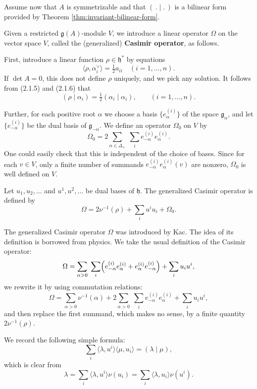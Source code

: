 \documentclass[12pt]{article}
\begin{document}
Assume now that $A$ is symmetrizable and that $(\,.\mid.\,)$ is a bilinear form provided by Theorem \ref{thm:invariant-bilinear-form}.

Given a restricted $\mathfrak{g}(A)$-module $V$, we introduce a linear operator $\Omega$ on the vector space $V$, called the (generalized) \textbf{Casimir operator}, as follows.  

First, introduce a linear function $\rho \in \mathfrak{h}^*$ by equations
\[
\langle \rho,\alpha_i^\vee \rangle = \tfrac{1}{2}a_{ii} \quad (i=1,\dots,n).
\]
If $\det A=0$, this does not define $\rho$ uniquely, and we pick any solution. 
It follows from (2.1.5) and (2.1.6) that
\[
(\rho\mid \alpha_i) = \tfrac{1}{2}(\alpha_i\mid \alpha_i), \qquad (i=1,\dots,n).
\]

Further, for each positive root $\alpha$ we choose a basis $\{e_\alpha^{(i)}\}$ of the space $\mathfrak{g}_\alpha$, 
and let $\{e_{-\alpha}^{(i)}\}$ be the dual basis of $\mathfrak{g}_{-\alpha}$. 
We define an operator $\Omega_0$ on $V$ by
\[
\Omega_0 = 2 \sum_{\alpha\in \Delta_+}\;\sum_i e_{-\alpha}^{(i)}e_\alpha^{(i)}.
\]
One could easily check that this is independent of the choice of bases.
Since for each $v\in V$, only a finite number of summands $e_{-\alpha}^{(i)}e_\alpha^{(i)}(v)$ are nonzero, $\Omega_0$ is well defined on $V$.

Let $u_1,u_2,\dots$ and $u^1,u^2,\dots$ be dual bases of $\mathfrak{h}$. 
The generalized Casimir operator is defined by
\[
\Omega = 2\nu^{-1}(\rho) + \sum_i u^i u_i + \Omega_0.
\]

\begin{remark}
    The generalized Casimir operator $\Omega$ was introduced by Kac. The idea of its definition is borrowed from physics. We take the usual definition of the Casimir operator:
\[
\Omega = \sum_{\alpha>0}\;\sum_i 
\Bigl(e_{-\alpha}^{(i)}e_\alpha^{(i)} + e_\alpha^{(i)}e_{-\alpha}^{(i)}\Bigr) 
+ \sum_i u_i u^i,
\]
we rewrite it by using commutation relations:
\[
\Omega = \sum_{\alpha>0} \nu^{-1}(\alpha) 
+ 2\sum_{\alpha>0}\;\sum_i e_{-\alpha}^{(i)}e_\alpha^{(i)} 
+ \sum_i u_i u^i,
\]
and then replace the first summand, which makes no sense, by a finite   quantity $2\nu^{-1}(\rho)$.
\end{remark}

We record the following simple formula:
\[
\sum_i \langle \lambda,u^i \rangle \langle \mu,u_i \rangle = (\lambda\mid \mu),
\]
which is clear from
\[
\lambda = \sum_i \langle \lambda,u^i\rangle \nu(u_i)
= \sum_i \langle \lambda,u_i\rangle \nu(u^i).
\]
\end{document}
